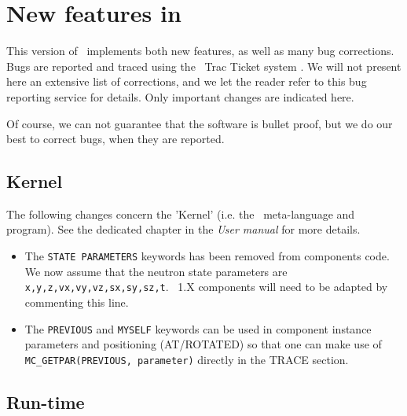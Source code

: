 
\chapter{New features in \MCS\ \version\ }
\label{c:changes}

This version of \MCS\ implements both new features, as well as many bug corrections. Bugs are reported and traced using the \MCS\ Trac Ticket system \cite{mczilla_webpage}. We will not present here an extensive list of corrections, and we let the reader refer to this bug reporting service for details. Only important changes are indicated here.

Of course, we can not guarantee that the software is bullet proof, but we do our best to correct bugs, when they are reported.


\section{Kernel}
\label{s:new-features:kernel}

The following changes concern the 'Kernel' (i.e. the \MCS\ meta-language and program). See the dedicated chapter in the {\it User manual} for more details.

\begin{itemize}
\item The \verb+STATE PARAMETERS+ keywords has been removed from components code. We now assume that the neutron state parameters are \verb+x,y,z,vx,vy,vz,sx,sy,sz,t+. \MCS\ 1.X components will need to be adapted by commenting this line.
\item The \verb+PREVIOUS+ and \verb+MYSELF+ keywords can be used in component instance parameters and positioning (AT/ROTATED) so that one can make use of \verb+MC_GETPAR(PREVIOUS, parameter)+ directly in the TRACE section.
\end{itemize}

\section{Run-time}
\label{s:new-features:run-time}

